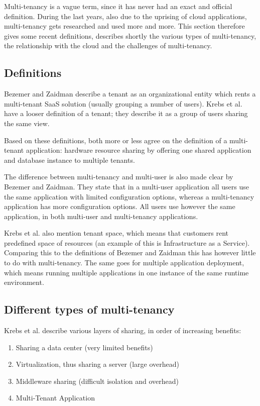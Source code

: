 Multi-tenancy is a vague term, since it has never had an exact and official definition. During the last years, also due to the uprising of cloud applications, multi-tenancy gets researched and used more and more. This section therefore gives some recent definitions, describes shortly the various types of multi-tenancy, the relationship with the cloud and the challenges of multi-tenancy.

\subsection{Definitions}

Bezemer and Zaidman\cite{bezemer2010multi} describe a tenant as an organizational entity which rents a multi-tenant SaaS solution (usually grouping a number of users). Krebs et al.\cite{krebs2012architecture} have a looser definition of a tenant; they describe it as a group of users sharing the same view.

Based on these definitions, both more or less agree on the definition of a multi-tenant application: hardware resource sharing by offering one shared application and database instance to multiple tenants.

The difference between multi-tenancy and multi-user is also made clear by Bezemer and Zaidman\cite{bezemer2010multi}. They state that in a multi-user application all users use the same application with limited configuration options, whereas a multi-tenancy application has more configuration options. All users use however the same application, in both multi-user and multi-tenancy applications.

Krebs et al.\cite{krebs2012architecture} also mention tenant space, which means that customers rent predefined space of resources (an example of this is Infrastructure as a Service). Comparing this to the definitions of Bezemer and Zaidman\cite{bezemer2010multi} this has however little to do with multi-tenancy. The same goes for multiple application deployment, which means running multiple applications in one instance of the same runtime environment.

\subsection{Different types of multi-tenancy}

Krebs et al.\cite{krebs2012architecture} describe various layers of sharing, in order of increasing benefits:
\begin{enumerate}
\item Sharing a data center (very limited benefits)
\item Virtualization, thus sharing a server (large overhead)
\item Middleware sharing (difficult isolation and overhead)
\item Multi-Tenant Application
\end{enumerate}

